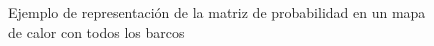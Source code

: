 \begin{frame}
    \begin{figure}
        \caption{Ejemplo de representación de la matriz de probabilidad en un mapa de calor con todos los barcos}
      \end{figure}
\end{frame}

